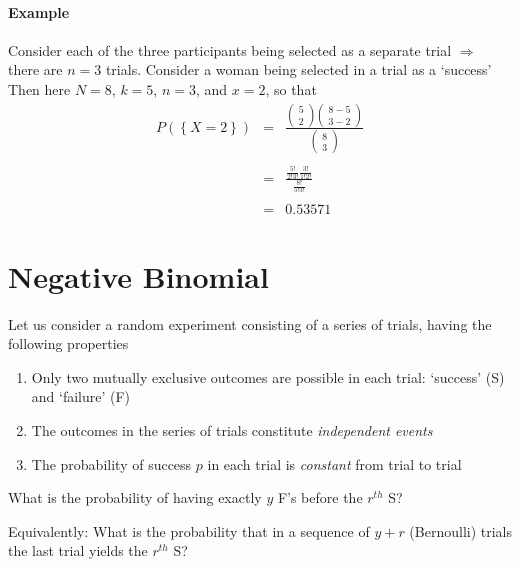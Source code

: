\documentclass[smaller]{beamer}\usepackage[]{graphicx}\usepackage[]{color}
\renewcommand{\Pr}{P}
\newenvironment{stepenumerate}{\begin{enumerate}[<+->]}{\end{enumerate}}
\begin{document}
\begin{frame}{\secname}
\framesubtitle{Example}
  \begin{example}[cont'd]
  Consider each of the three participants being selected as a separate
  trial $\Rightarrow $ there are $n=3$ trials. Consider a woman being selected in a trial as a `success'
  \\
  Then here $N=8$, $k=5$, $n=3$, and $x=2$, so that%
  \begin{eqnarray*}
  \Pr (\left\{ X=2\right\})  &=&\frac{\left(
  \begin{array}{c}
  5 \\
  2%
  \end{array}%
  \right) \left(
  \begin{array}{c}
  8-5 \\
  3-2%
  \end{array}%
  \right) }{\left(
  \begin{array}{c}
  8 \\
  3%
  \end{array}%
  \right) } \\
  && \\
  &=&\frac{\frac{5!}{2!3!}\frac{3!}{1!2!}}{\frac{8!}{5!3!}} \\
  && \\
  &=&0.53571
  \end{eqnarray*}
  \end{example}
\end{frame}


\section{Negative Binomial}


\begin{frame}{\secname}%
  \begin{definition}

  Let us consider a random experiment consisting of a series of trials, having
  the following properties \medskip

  \begin{stepenumerate}
  \item Only two mutually exclusive outcomes are possible in each trial:
  `success' (S) and `failure' (F)
  \medskip
  \item The outcomes in the series of trials constitute \emph{independent
  events}
  \medskip
  \item The probability of success $p$ in each trial is \emph{constant }from
  trial to trial
  \end{stepenumerate}
  \medskip
  What is the probability of having exactly $y$ F's before the $r^{th}$
  S? \\ \medskip

  Equivalently: What is the probability that in a sequence of $y+r$ (Bernoulli) trials the last trial yields the
  $r^{th}$ S?
  \end{definition}
\end{frame}
\end{document}
